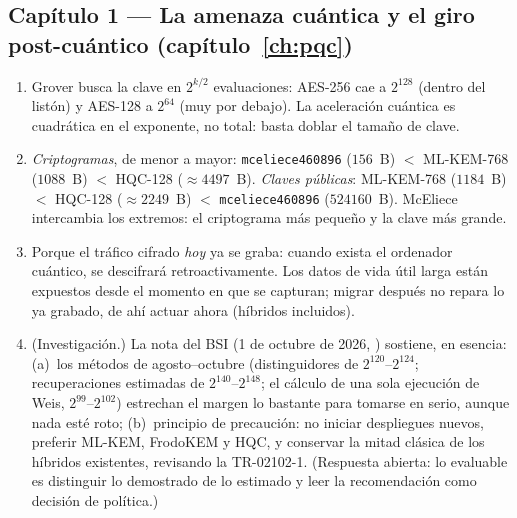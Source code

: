 \documentclass[11pt,a4paper,oneside]{report}
\begin{document}

\subsection*{Capítulo 1 --- La amenaza cuántica y el giro
post-cuántico (capítulo~\ref{ch:pqc})}

\begin{enumerate}[leftmargin=1.9em,itemsep=4pt]
  \item Grover busca la clave en $2^{k/2}$ evaluaciones: AES-256
        cae a $2^{128}$ (dentro del listón) y AES-128 a $2^{64}$
        (muy por debajo). La aceleración cuántica es cuadrática en el
        exponente, no total: basta doblar el tamaño de clave.
  \item \emph{Criptogramas}, de menor a mayor: \texttt{mceliece460896}
        ($156$~B) $<$ ML-KEM-768 ($1088$~B) $<$ HQC-128
        ($\approx4497$~B). \emph{Claves públicas}: ML-KEM-768
        ($1184$~B) $<$ HQC-128 ($\approx2249$~B) $<$
        \texttt{mceliece460896} ($\num{524160}$~B). McEliece
        intercambia los extremos: el criptograma más pequeño y la
        clave más grande.
  \item Porque el tráfico cifrado \emph{hoy} ya se graba: cuando
        exista el ordenador cuántico, se descifrará retroactivamente.
        Los datos de vida útil larga están expuestos desde el momento
        en que se capturan; migrar después no repara lo ya grabado, de
        ahí actuar ahora (híbridos incluidos).
  \item \textnormal{(}Investigación.\textnormal{)} La nota del BSI
        (1 de octubre de 2026, \cite{bsi2026}) sostiene, en esencia:
        (a)~los métodos de agosto--octubre (distinguidores de
        $2^{120}$--$2^{124}$; recuperaciones estimadas de
        $2^{140}$--$2^{148}$; el cálculo de una sola ejecución de
        Weis, $2^{99}$--$2^{102}$) estrechan el margen lo bastante
        para tomarse en serio, aunque nada esté roto; (b)~principio de
        precaución: no iniciar despliegues nuevos, preferir ML-KEM,
        FrodoKEM y HQC, y conservar la mitad clásica de los híbridos
        existentes, revisando la TR-02102-1. (Respuesta abierta: lo
        evaluable es distinguir lo demostrado de lo estimado y leer
        la recomendación como decisión de política.)
\end{enumerate}
\end{document}
